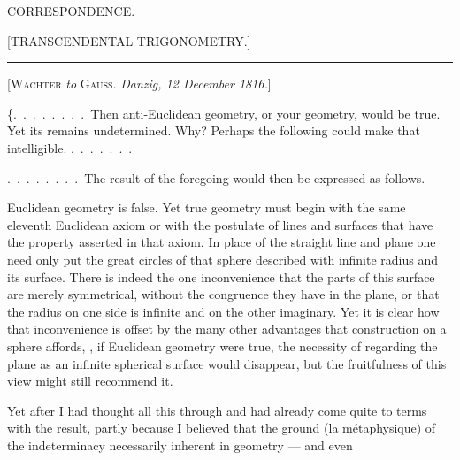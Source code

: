 \clearpage{}
\begin{center}
{\Large CORRESPONDENCE.}
\end{center}

\bigskip
\begin{center}
[TRANSCENDENTAL TRIGONOMETRY.]
\end{center}

\begin{center}\rule{2cm}{0.4pt}\end{center}

\begin{center}
[\textsc{Wachter} \emph{to} \textsc{Gauss}. \emph{Danzig, 12 December 1816.}]
\end{center}

\{.\ .\ .\ .\ .\ .\ .\ .\ Then anti-Euclidean geometry, or your geometry, would be true.
Yet its  remains undetermined. Why? Perhaps the
following could make that intelligible. .\ .\ .\ .\ .\ .\ .

.\ .\ .\ .\ .\ .\ .\ .\ The result of the foregoing would then be expressed as follows.

Euclidean
geometry is false. Yet true geometry must begin with
the same eleventh Euclidean axiom or with the postulate of lines and surfaces
that have the property asserted in that axiom. In place of the
straight line and plane one need only put the great circles of that sphere described with infinite radius
and its surface. There is indeed the one
inconvenience that the parts of this surface are merely symmetrical, without the
congruence they have in the plane, or that the radius on one side is
infinite and on the other imaginary. Yet it is clear how that inconvenience
is offset by the many other advantages that construction on a sphere
affords, , if
Euclidean geometry were true, the necessity of regarding
the plane as an infinite spherical surface would disappear, but the
fruitfulness of this view might still recommend it.

Yet after I had thought all this through and had already come
quite to terms with the result, partly because I believed that the ground (la métaphysique)
of the indeterminacy necessarily inherent in geometry --- and even
